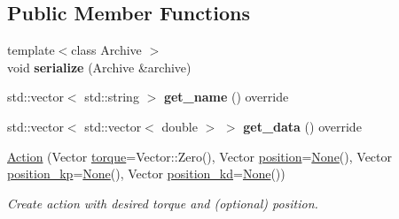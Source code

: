 \subsection*{Public Member Functions}
\begin{DoxyCompactItemize}
\item 
{\footnotesize template$<$class Archive $>$ }\\void {\bfseries serialize} (Archive \&archive)\hypertarget{structrobot__interfaces_1_1NJointRobotTypes_1_1Action_a7f645ab9be5cee75974d9cf1d4300c67}{}\label{structrobot__interfaces_1_1NJointRobotTypes_1_1Action_a7f645ab9be5cee75974d9cf1d4300c67}

\item 
std\+::vector$<$ std\+::string $>$ {\bfseries get\+\_\+name} () override\hypertarget{structrobot__interfaces_1_1NJointRobotTypes_1_1Action_a4d4b702fdf41cc9713c46edbbb26db51}{}\label{structrobot__interfaces_1_1NJointRobotTypes_1_1Action_a4d4b702fdf41cc9713c46edbbb26db51}

\item 
std\+::vector$<$ std\+::vector$<$ double $>$ $>$ {\bfseries get\+\_\+data} () override\hypertarget{structrobot__interfaces_1_1NJointRobotTypes_1_1Action_a8fe4c10c53d72e4f8bb9c09d3be9b39d}{}\label{structrobot__interfaces_1_1NJointRobotTypes_1_1Action_a8fe4c10c53d72e4f8bb9c09d3be9b39d}

\item 
\hyperlink{structrobot__interfaces_1_1NJointRobotTypes_1_1Action_aeb7fbd93adcc0140b5db42298211fe9d}{Action} (Vector \hyperlink{structrobot__interfaces_1_1NJointRobotTypes_1_1Action_ad19a93b677bdc60e655071743acf160e}{torque}=Vector\+::\+Zero(), Vector \hyperlink{structrobot__interfaces_1_1NJointRobotTypes_1_1Action_ad0d8104b1e521c7d0a316d093155e3a8}{position}=\hyperlink{structrobot__interfaces_1_1NJointRobotTypes_1_1Action_ab963d5faa78618bdaae53dc70ca936ae}{None}(), Vector \hyperlink{structrobot__interfaces_1_1NJointRobotTypes_1_1Action_a16eb24df6bdbc10c8ce08c0621723b92}{position\+\_\+kp}=\hyperlink{structrobot__interfaces_1_1NJointRobotTypes_1_1Action_ab963d5faa78618bdaae53dc70ca936ae}{None}(), Vector \hyperlink{structrobot__interfaces_1_1NJointRobotTypes_1_1Action_a3690aa864884fb51fb411d26eeea3fd4}{position\+\_\+kd}=\hyperlink{structrobot__interfaces_1_1NJointRobotTypes_1_1Action_ab963d5faa78618bdaae53dc70ca936ae}{None}())
\begin{DoxyCompactList}\small\item\em Create action with desired torque and (optional) position. \end{DoxyCompactList}\end{DoxyCompactItemize}
